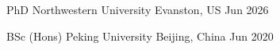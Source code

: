 


\begin{cventries}


\cvsimsimpentry
{PhD} %
{Northwestern University} %
{Evanston, US} %
{Jun 2026} %


\cvsimsimpentry
{BSc (Hons)} %
{Peking University} %
{Beijing, China} %
{Jun 2020} %

\end{cventries}